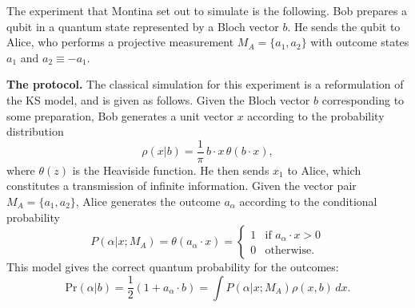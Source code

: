 \documentclass[12pt,draft]{article}
\theoremstyle{definition}
\theoremstyle{plain}
\begin{document}
    The experiment that Montina set out to simulate is the
    following. Bob prepares a qubit in a quantum state
    represented by a Bloch vector $b$. He sends the
    qubit to Alice, who performs a projective measurement
    $M_A = \{a_1, a_2\}$ with outcome states $
    a_1$ and $a_2 \equiv -a_1$. 

    \textbf{The protocol.} The classical simulation for this
    experiment is a reformulation of the KS model, and is
    given as follows.  Given the Bloch vector $b$
    corresponding to some preparation, Bob generates a unit
    vector $x$ according to the probability distribution
    \begin{equation}
        \rho(x | b)
        = \frac{1}{\pi} \, b \cdot x \,
        \theta(b \cdot x),
        \label{eqn:ks-rho}
    \end{equation}
    where $\theta(z)$ is the Heaviside function. He then
    sends $x_1$ to Alice, which constitutes a transmission
    of infinite information. Given the vector pair $M_A =
    \{a_1, a_2\}$, Alice generates the outcome $a_\alpha$
    according to the conditional probability
    \begin{equation}
        P(\alpha | x; M_A)
        = \theta(a_\alpha \cdot x)
        = \begin{cases}
            1 & \text{if } a_\alpha \cdot x > 0
            \\
            0 & \text{otherwise.}
        \end{cases}
    \end{equation}
    This model gives the correct quantum probability for the
    outcomes:
    \begin{equation}
        \text{Pr}(\alpha | b)
        = \frac{1}{2} \left( 1 + a_\alpha \cdot b
        \right) 
        = \int P(\alpha | x ; M_A) \rho(x, b) \, d x.
    \end{equation}
\end{document}
